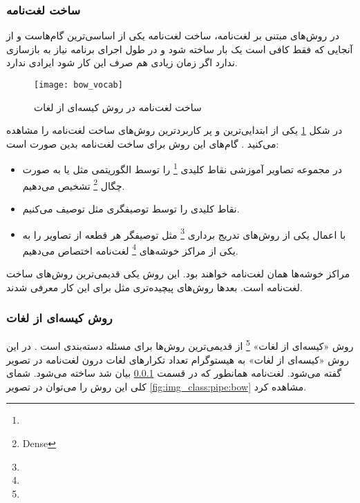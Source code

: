 \documentclass[11pt]{article}
\begin{document}
\subsubsection{ساخت لغت‌نامه}\label{sec:img_class:vocab}
در روش‌های مبتنی بر لغت‌نامه، ساخت لغت‌نامه یکی از اساسی‌ترین گام‌هاست و از آنجایی که فقط کافی است یک بار ساخته شود و در طول اجرای برنامه نیاز به بازسازی ندارد اگر زمان زیادی هم صرف این کار شود ایرادی ندارد.
\begin{figure}[t!]
	\centering
	\texttt{[image: bow\_vocab]}
	\caption{ساخت لغت‌نامه در روش کیسه‌ای از لغات}
	\label{fig:img_class:bow_vocab}
\end{figure}
در شکل
\ref{fig:img_class:bow_vocab}
یکی از ابتدایی‌ترین و پر کاربردترین روش‌های ساخت لغت‌نامه را مشاهده می‌کنید
\cite{csurka2004}.
گام‌های این روش برای ساخت لغت‌نامه بدین صورت است:
\begin{itemize}
	\item در مجموعه تصاویر آموزشی نقاط کلیدی
	\footnote{}
	را توسط الگوریتمی مثل
	 \cite{harris_affine}
	یا به صورت چگال
	\footnote{Dense}
	تشخیص می‌دهیم.

	\item نقاط کلیدی را توسط توصیفگری مثل
	 \cite{sift}
	توصیف می‌کنیم.
	\item با اعمال یکی از روش‌های تدریج برداری
	\footnote{}
	مثل
	توصیفگر هر قطعه از تصاویر را به یکی از مراکز خوشه‌های
	\footnote{}
	لغت‌نامه اختصاص می‌دهیم.
\end{itemize}
مراکز خوشه‌ها همان لغت‌نامه خواهند بود. این روش یکی قدیمی‌ترین روش‌های ساخت لغت‌نامه است. بعدها روش‌های پیچیده‌تری مثل
\cite{adapted_vocab, jurie2005}
برای این کار معرفی شدند. 
\subsubsection{روش کیسه‌ای از لغات}
روش «کیسه‌ای از لغات»
\footnote{}
از قدیمی‌ترین روش‌ها برای مسئله دسته‌بندی است
\cite{csurka2004}.
در این روش «کیسه‌ای از لغات» به هیستوگرام تعداد تکرارهای لغات درون لغت‌نامه در تصویر گفته می‌شود. لغت‌نامه همانطور که در قسمت
\ref{sec:img_class:vocab}
بیان شد ساخته می‌شود. شمای کلی این روش را می‌توان در تصویر
\ref{fig:img_class:pipe:bow}
مشاهده کرد.
\end{document}
